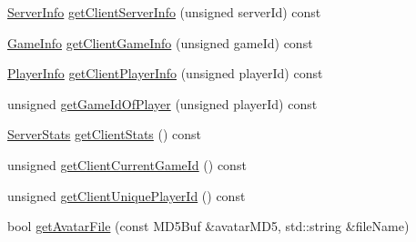 \begin{DoxyCompactItemize}
\item 
\hyperlink{struct_server_info}{Server\-Info} \hyperlink{class_session_a103970a0117442b4db09adaef04847d7}{get\-Client\-Server\-Info} (unsigned server\-Id) const 
\item 
\hyperlink{struct_game_info}{Game\-Info} \hyperlink{class_session_a8f16216769638acec9ce003aca038e67}{get\-Client\-Game\-Info} (unsigned game\-Id) const 
\item 
\hyperlink{struct_player_info}{Player\-Info} \hyperlink{class_session_af0c26f5815db03ddcb83491a080383e3}{get\-Client\-Player\-Info} (unsigned player\-Id) const 
\item 
unsigned \hyperlink{class_session_a4cd156a99a379a966424cfefd93cd31b}{get\-Game\-Id\-Of\-Player} (unsigned player\-Id) const 
\item 
\hyperlink{struct_server_stats}{Server\-Stats} \hyperlink{class_session_aa69deeb42f29e39020a85a7396992925}{get\-Client\-Stats} () const 
\item 
unsigned \hyperlink{class_session_aab5ba527a87413cdeab6a5ea00f4c30d}{get\-Client\-Current\-Game\-Id} () const 
\item 
unsigned \hyperlink{class_session_a82aff275cb035b0440f5139d54338b99}{get\-Client\-Unique\-Player\-Id} () const 
\item 
bool \hyperlink{class_session_aae0e047300fee326aaf11fb060df135e}{get\-Avatar\-File} (const M\-D5\-Buf \&avatar\-M\-D5, std\-::string \&file\-Name)
\end{DoxyCompactItemize}
